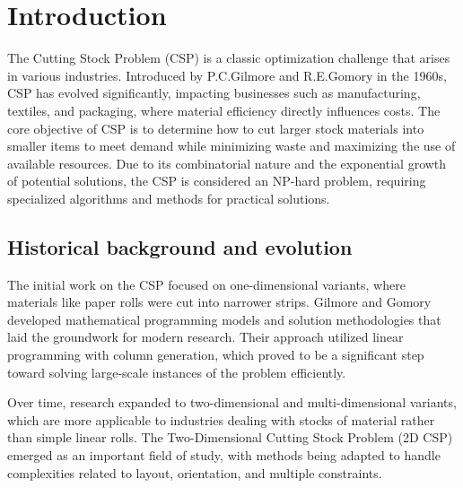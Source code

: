 \documentclass[a4paper]{article}
\begin{document}
\setcounter{page}{0}
\thispagestyle{empty}
\newpage
\tableofcontents
\newpage

\section{Introduction}
The Cutting Stock Problem (CSP) is a classic optimization challenge that arises in various industries. Introduced by P.C.Gilmore and R.E.Gomory in the 1960s, CSP has evolved significantly, impacting businesses such as manufacturing, textiles, and packaging, where material efficiency directly influences costs. The core objective of CSP is to determine how to cut larger stock materials into smaller items to meet demand while minimizing waste and maximizing the use of available resources. Due to its combinatorial nature and the exponential growth of potential solutions, the CSP is considered an NP-hard problem, requiring specialized algorithms and methods for practical solutions. 
\subsection{Historical background and evolution}
The initial work on the CSP focused on one-dimensional variants, where materials like paper rolls were cut into narrower strips. Gilmore and Gomory developed mathematical programming models and solution methodologies that laid the groundwork for modern research. Their approach utilized linear programming with column generation, which proved to be a significant step toward solving large-scale instances of the problem efficiently.

\vspace{0.4cm}

\noindent Over time, research expanded to two-dimensional and multi-dimensional variants, which are more applicable to industries dealing with stocks of material rather than simple linear rolls. The Two-Dimensional Cutting Stock Problem (2D CSP) emerged as an important field of study, with methods being adapted to handle complexities related to layout, orientation, and multiple constraints.
\end{document}
